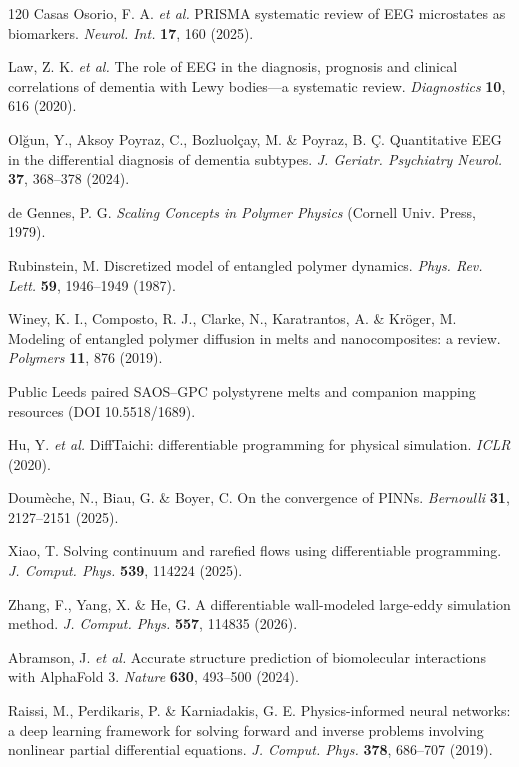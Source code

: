 \documentclass[twocolumn, 10pt]{article}
\begin{document}
\begin{thebibliography}{120}
 Casas Osorio, F. A. \emph{et al.} PRISMA systematic review of EEG microstates as biomarkers. \emph{Neurol. Int.} \textbf{17}, 160 (2025).

 Law, Z. K. \emph{et al.} The role of EEG in the diagnosis, prognosis and clinical correlations of dementia with Lewy bodies—a systematic review. \emph{Diagnostics} \textbf{10}, 616 (2020).

 Olğun, Y., Aksoy Poyraz, C., Bozluolçay, M. \& Poyraz, B. Ç. Quantitative EEG in the differential diagnosis of dementia subtypes. \emph{J. Geriatr. Psychiatry Neurol.} \textbf{37}, 368--378 (2024).

 de Gennes, P. G. \emph{Scaling Concepts in Polymer Physics} (Cornell Univ. Press, 1979).

 Rubinstein, M. Discretized model of entangled polymer dynamics. \emph{Phys. Rev. Lett.} \textbf{59}, 1946--1949 (1987).

 Winey, K. I., Composto, R. J., Clarke, N., Karatrantos, A. \& Kröger, M. Modeling of entangled polymer diffusion in melts and nanocomposites: a review. \emph{Polymers} \textbf{11}, 876 (2019).

 Public Leeds paired SAOS--GPC polystyrene melts and companion mapping resources (DOI 10.5518/1689).

 Hu, Y. \emph{et al.} DiffTaichi: differentiable programming for physical simulation. \emph{ICLR} (2020).

 Doumèche, N., Biau, G. \& Boyer, C. On the convergence of PINNs. \emph{Bernoulli} \textbf{31}, 2127--2151 (2025).

 Xiao, T. Solving continuum and rarefied flows using differentiable programming. \emph{J. Comput. Phys.} \textbf{539}, 114224 (2025).

 Zhang, F., Yang, X. \& He, G. A differentiable wall-modeled large-eddy simulation method. \emph{J. Comput. Phys.} \textbf{557}, 114835 (2026).

 Abramson, J. \emph{et al.} Accurate structure prediction of biomolecular interactions with AlphaFold 3. \emph{Nature} \textbf{630}, 493--500 (2024).

 Raissi, M., Perdikaris, P. \& Karniadakis, G. E. Physics-informed neural networks: a deep learning framework for solving forward and inverse problems involving nonlinear partial differential equations. \emph{J. Comput. Phys.} \textbf{378}, 686--707 (2019).


\end{thebibliography}
\end{document}
